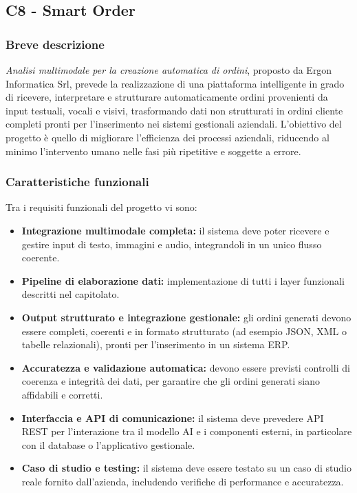 \documentclass[a4paper,11pt]{article}
\begin{document}
\subsection{C8 - Smart Order}
\subsubsection{Breve descrizione}
\parbox[h]{\linewidth}{%
\textit{Analisi multimodale per la creazione automatica di
ordini}, proposto da Ergon Informatica Srl, prevede la realizzazione di una
piattaforma intelligente in grado di ricevere, interpretare e strutturare
automaticamente ordini provenienti da input testuali, vocali e visivi, trasformando
dati non strutturati in ordini cliente completi pronti per l'inserimento nei sistemi
gestionali aziendali. L'obiettivo del progetto è quello di migliorare l'efficienza dei
processi aziendali, riducendo al minimo l'intervento umano nelle fasi più ripetitive
e soggette a errore.
}

\subsubsection{Caratteristiche funzionali}
Tra i requisiti funzionali del progetto vi sono:
\begin{itemize}
 \item \textbf{Integrazione multimodale completa:} il sistema deve poter ricevere e gestire input di testo, immagini e audio, integrandoli in un unico flusso coerente.
 \item \textbf{Pipeline di elaborazione dati:} implementazione di tutti i layer funzionali descritti nel capitolato.
 \item \textbf{Output strutturato e integrazione gestionale:} gli ordini generati devono essere completi, coerenti e in formato strutturato (ad esempio JSON, XML o tabelle relazionali), pronti per l'inserimento in un sistema ERP.
 \item \textbf{Accuratezza e validazione automatica:} devono essere previsti controlli di coerenza e integrità dei dati, per garantire che gli ordini generati siano affidabili e corretti.
 \item \textbf{Interfaccia e API di comunicazione:} il sistema deve prevedere API REST per l'interazione tra il modello AI e i componenti esterni, in particolare con il database o l'applicativo gestionale.
 \item \textbf{Caso di studio e testing:} il sistema deve essere testato su un caso di studio reale fornito dall'azienda, includendo verifiche di performance e accuratezza.
\end{itemize}
\end{document}
